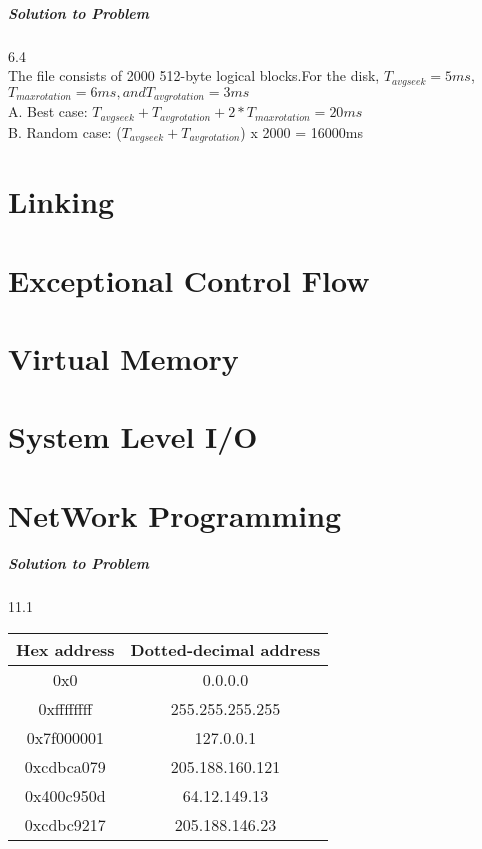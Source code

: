 \documentclass{report}
\begin{document}
\paragraph{Solution to Problem } 6.4\\
The file consists of 2000 512-byte logical blocks.For the disk, $T_{avg seek} = 5ms$, $T_{max rotation} = 6ms, and T_{avg rotation} = 3ms$ \\
A. Best case:  $T_{avg seek} + T_{avg rotation} + 2 * T_{max rotation} = 20ms $ \\
B. Random case: ($T_{avg seek} + T_{avg rotation}$) x 2000 = 16000ms

















\chapter{Linking}
\chapter{Exceptional Control Flow}
\chapter{Virtual Memory}
\chapter{System Level I/O}
\chapter{NetWork Programming}
\paragraph{Solution to Problem } 11.1\\
\begin{center}
\begin{tabular}{ |c|c| } 
\hline
Hex address & Dotted-decimal address \\ \hline
0x0 & 0.0.0.0 \\
0xffffffff & 255.255.255.255 \\
0x7f000001 & 127.0.0.1 \\
0xcdbca079 & 205.188.160.121 \\
0x400c950d & 64.12.149.13 \\
0xcdbc9217 & 205.188.146.23 \\
\hline
\end{tabular}
\end{center}
\end{document}
